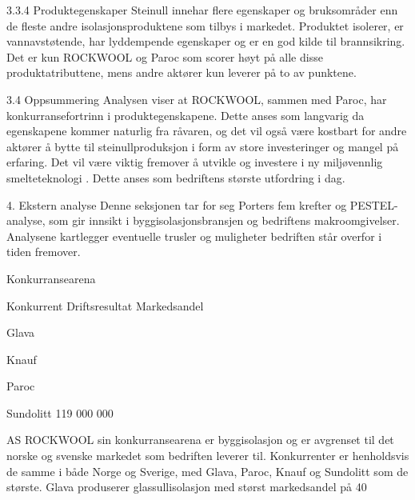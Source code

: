 3.3.4 Produktegenskaper
Steinull innehar flere egenskaper og bruksområder enn de fleste andre isolasjonsproduktene som tilbys i markedet. Produktet isolerer, er vannavstøtende, har lyddempende egenskaper og er en god kilde til brannsikring. Det er kun ROCKWOOL og Paroc som scorer høyt på alle disse produktatributtene, mens andre aktører kun leverer på to av punktene.  

3.4 Oppsummering 
Analysen viser at ROCKWOOL, sammen med Paroc, har konkurransefortrinn i produktegenskapene. Dette anses som langvarig da egenskapene kommer naturlig fra råvaren, og det vil også være kostbart for andre aktører å bytte til steinullproduksjon i form av store investeringer og mangel på erfaring. Det vil være viktig fremover å utvikle og investere i ny miljøvennlig smelteteknologi . Dette anses som bedriftens største utfordring i dag.

4. Ekstern analyse
Denne seksjonen tar for seg Porters fem krefter og PESTEL- analyse, som gir innsikt i byggisolasjonsbransjen og bedriftens makroomgivelser. Analysene kartlegger eventuelle trusler og muligheter bedriften står overfor i tiden fremover.

Konkurransearena


Konkurrent
Driftsresultat 
Markedsandel




Glava








Knauf








Paroc








Sundolitt
119 000 000







AS ROCKWOOL sin konkurransearena er byggisolasjon og er avgrenset til det norske og svenske markedet som bedriften leverer til.  Konkurrenter er henholdsvis de samme i både Norge og Sverige, med Glava, Paroc, Knauf og Sundolitt som de største. Glava produserer glassullisolasjon med størst markedsandel på 40%



